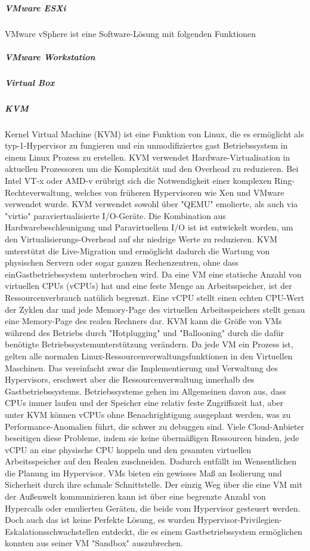 \subparagraph {VMware ESXi \cite{Fayyad-Kazan2013BenchmarkingHypervisors}}
VMware vSphere ist eine Software-Lösung mit folgenden Funktionen


\subparagraph {VMware Workstation}
\subparagraph{Virtual Box}


\subparagraph{KVM}
Kernel Virtual Machine (KVM) ist eine Funktion von Linux, die es ermöglicht als typ-1-Hypervisor zu fungieren und ein unmodifiziertes gast Betriebssystem in einem Linux Prozess zu erstellen. KVM verwendet Hardware-Virtualisation in aktuellen Prozessoren um die Komplexität und den Overhead zu reduzieren. Bei Intel VT-x oder AMD-v erübrigt sich die Notwendigkeit einer komplexen Ring-Rechteverwaltung, welches von früheren Hypervisoren wie Xen und VMware verwendet wurde. KVM verwendet sowohl über "QEMU\cite{QEMUEmulator}" emolierte, als auch via "virtio\cite{View2018VirtioVirtio}" paraviertualisierte I/O-Geräte. Die Kombination aus Hardwarebeschleunigung und Paravirtuellem I/O ist ist entwickelt worden, um den Virtualisierungs-Overhead auf shr niedrige Werte zu reduzieren. KVM unterstützt die Live-Migration und ermöglicht dadurch die Wartung von physischen Servern oder sogar ganzen Rechenzentren, ohne dass einGastbetriebssystem unterbrochen wird. Da eine VM eine statische Anzahl von virtuellen CPUs (vCPUs) hat und eine feste Menge an Arbeitsspeicher, ist der Ressourcenverbrauch natülich begrenzt. Eine vCPU stellt einen echten CPU-Wert der Zyklen dar und jede Memory-Page des virtuellen Arbeitsspeichers stellt genau eine Memory-Page des realen Rechners dar. KVM kann die Größe von VMs während des Betriebs durch "Hotplugging" und "Ballooning" durch die dafür benötigte Betriebssystemunterstützung verändern. Da jede VM ein Prozess ist, gelten alle normalen Linux-Ressourcenverwaltungsfunktionen in den Virtuellen Maschinen. Das vereinfacht zwar die Implementierung und Verwaltung des Hypervisors, erschwert aber die Ressourcenverwaltung innerhalb des Gastbetriebssystems. Betriebssysteme gehen im Allgemeinen davon aus, dass CPUs immer laufen und der Speicher eine relativ feste Zugriffszeit hat, aber unter KVM können vCPUs ohne Benachrightigung ausgeplant werden, was zu Performance-Anomalien führt, die schwer zu debuggen sind. Viele Cloud-Anbieter beseitigen diese Probleme, indem sie keine übermäßigen Ressourcen binden, jede vCPU an eine physische CPU koppeln und den gesamten virtuellen Arbeitsspeicher auf den Realen zuschneiden. Dadurch entfällt im Wensentlichen die Planung im Hypervisor. VMs bieten ein gewisses Maß an Isolierung und Sicherheit durch ihre schmale Schnittstelle. Der einzig Weg über die eine VM mit der Außenwelt kommunizieren kann ist über eine begrenzte Anzahl von Hypercalls oder emulierten Geräten, die beide vom Hypervisor gesteuert werden. Doch auch das ist keine Perfekte Lösung, es wurden Hypervisor-Privilegien-Eskalationsschwachstellen entdeckt, die es einem Gastbetriebssystem ermöglichen konnten aus seiner VM "Sandbox" auszubrechen\cite{Felter2014IBMContainers}.

